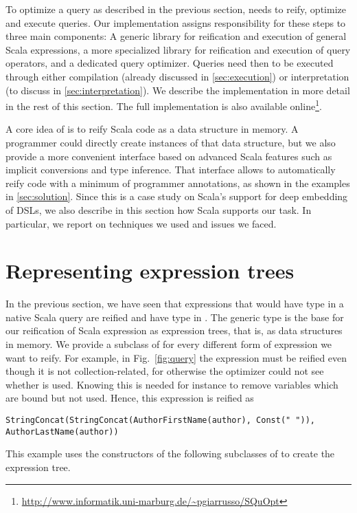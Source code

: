 To optimize a query as described in the previous section, {\LoS} needs to reify, optimize and execute queries. 
Our implementation assigns responsibility for these steps to three main components: A generic library for reification and execution of general Scala expressions, a more specialized library for reification and execution of query operators, and a dedicated query optimizer.
Queries need then to be executed through either compilation (already discussed in
\cref{sec:execution}) or interpretation (to discuss in \cref{sec:interpretation}).
We describe the implementation in more detail in the rest of this section. The full implementation is also available online\footnote{\url{http://www.informatik.uni-marburg.de/~pgiarrusso/SQuOpt}}.

A core idea of {\LoS} is to reify Scala code as a data structure in memory. A programmer could directly create instances of that data structure, but we also provide a more convenient interface based on advanced Scala features such as implicit conversions and type inference. That interface allows to automatically reify code with a minimum of programmer annotations, as shown in the examples in \cref{sec:solution}. Since this is a case study on Scala's support for deep embedding of DSLs, we also describe in this section how Scala supports our task. In particular, we report on techniques we used and issues we faced.

\section{Representing expression trees}
\label{subsec:repexptrees}
In the previous section, we have seen that expressions that would have type  in a native Scala query are reified and have type  in \LoS. The generic type  is the base for our reification of Scala expression as expression trees, that is, as data structures in memory. We provide a subclass of  for every different form of expression we want to reify. For example, in Fig.~\ref{fig:query} the expression  must be reified even though it is not collection-related, for otherwise the optimizer could not see whether  is used. Knowing this is needed for instance to remove variables which are bound but not used. Hence, this expression is reified as
\begin{lstlisting}
StringConcat(StringConcat(AuthorFirstName(author), Const(" ")), AuthorLastName(author))
\end{lstlisting}
This example uses the constructors of the following subclasses of  to create the expression tree.

